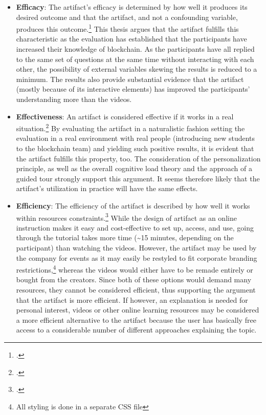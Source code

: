 \begin{itemize}
    \item \textbf{Efficacy}: The artifact's efficacy is determined by how well it produces its desired outcome and that the artifact, and not a confounding variable, produces this outcome.\footcite[Cf.][p.427]{Pries-HejeComprehensiveFrameworkEvaluation2012} This thesis argues that the artifact fulfills this characteristic as the evaluation has established that the participants have increased their knowledge of blockchain. As the participants have all replied to the same set of questions at the same time without interacting with each other, the possibility of external variables skewing the results is reduced to a minimum. The results also provide substantial evidence that the artifact (mostly because of its interactive elements) has improved the participants' understanding more than the videos.
    \item \textbf{Effectiveness}: An artifact is considered effective if it works in a real situation.\footcite[Cf.][p.428]{Pries-HejeComprehensiveFrameworkEvaluation2012} By evaluating the artifact in a naturalistic fashion setting the evaluation in a real environment with real people (introducing new students to the blockchain team) and yielding such positive results, it is evident that the artifact fulfills this property, too. The consideration of the personalization principle, as well as the overall cognitive load theory and the approach of a guided tour strongly support this argument. It seems therefore likely that the artifact's utilization in practice will have the same effects.
    \item \textbf{Efficiency}: The efficiency of the artifact is described by how well it works within resources constraints.\footcite[Cf.][p.427]{Pries-HejeComprehensiveFrameworkEvaluation2012} While the design of artifact as an online instruction makes it easy and cost-effective to set up, access, and use, going through the tutorial takes more time (\textasciitilde15 minutes, depending on the participant) than watching the videos. However, the artifact may be used by the company for events as it may easily be restyled to fit corporate branding restrictions,\footnote{All styling is done in a separate \ac{CSS} file} whereas the videos would either have to be remade entirely or bought from the creators. Since both of these options would demand many resources, they cannot be considered efficient, thus supporting the argument that the artifact is more efficient. If however, an explanation is needed for personal interest, videos or other online learning resources may be considered a more efficient alternative to the artifact because the user has basically free access to a considerable number of different approaches explaining the topic.

\end{itemize}
